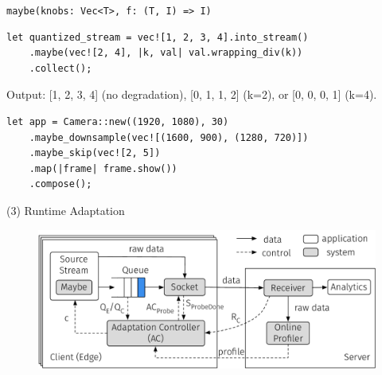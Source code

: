 \begin{frame}[fragile]{\texttt{maybe(knobs: Vec<T>, f: (T, I) => I)}}
  \begin{lstlisting}
let quantized_stream = vec![1, 2, 3, 4].into_stream()
    .maybe(vec![2, 4], |k, val| val.wrapping_div(k))
    .collect();
  \end{lstlisting}
  Output: [1, 2, 3, 4] (no degradation), [0, 1, 1, 2] (k=2), or [0, 0, 0, 1]
  (k=4).

  \pause
  \vspace{2em}
  \begin{lstlisting}
let app = Camera::new((1920, 1080), 30)
    .maybe_downsample(vec![(1600, 900), (1280, 720)])
    .maybe_skip(vec![2, 5])
    .map(|frame| frame.show())
    .compose();
  \end{lstlisting}

\end{frame}

\begin{frame}{(3) Runtime Adaptation}
  \begin{figure}
    \centering
    \includegraphics[width=\linewidth]{figures/runtime-adaptation.pdf}
  \end{figure}
\end{frame}

